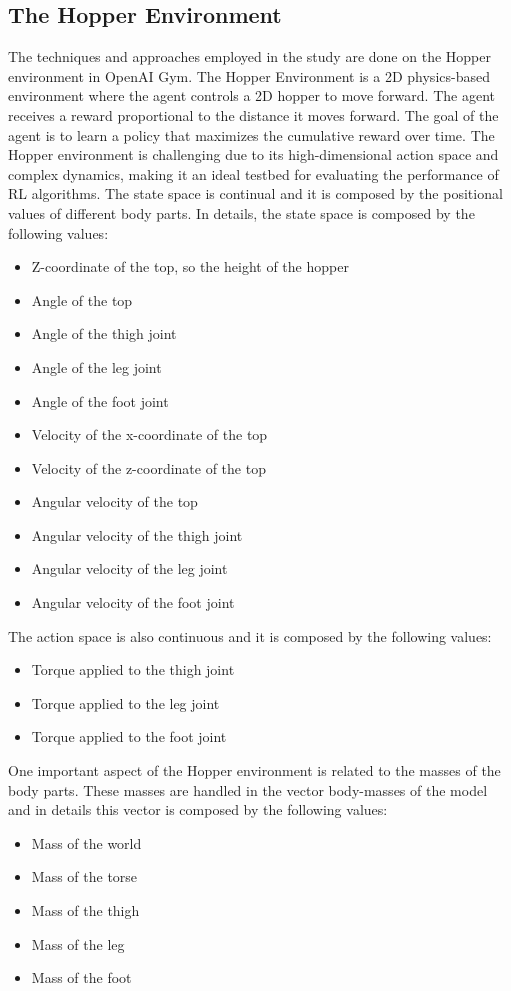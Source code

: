 \documentclass[12pt]{article}
\begin{document}
\subsection{The Hopper Environment}
The techniques and approaches employed in the study are done on the Hopper environment in OpenAI Gym. 
The Hopper Environment is a 2D physics-based environment where the agent controls a 2D hopper to move forward. The agent receives a reward proportional to the distance it moves forward. The goal of the agent is to learn a policy that maximizes the cumulative reward over time. The Hopper environment is challenging due to its high-dimensional action space and complex dynamics, making it an ideal testbed for evaluating the performance of RL algorithms. 
The state space is continual and it is composed by the positional values of different body parts. In details, the state space is composed by the following values:
\begin{itemize}
    \item Z-coordinate of the top, so the height of the hopper
    \item Angle of the top
    \item Angle of the thigh joint
    \item Angle of the leg joint
    \item Angle of the foot joint
    \item Velocity of the x-coordinate of the top
    \item Velocity of the z-coordinate of the top
    \item Angular velocity of the top
    \item Angular velocity of the thigh joint
    \item Angular velocity of the leg joint
    \item Angular velocity of the foot joint
\end{itemize}

The action space is also continuous and it is composed by the following values:
\begin{itemize}
    \item Torque applied to the thigh joint
    \item Torque applied to the leg joint
    \item Torque applied to the foot joint
\end{itemize}

One important aspect of the Hopper environment is related to the masses of the body parts. These masses are handled in the vector body-masses of the model and in details this vector is composed by the following values:
\begin{itemize}
    \item Mass of the world
    \item Mass of the torse
    \item Mass of the thigh
    \item Mass of the leg
    \item Mass of the foot
\end{itemize}
\end{document}
